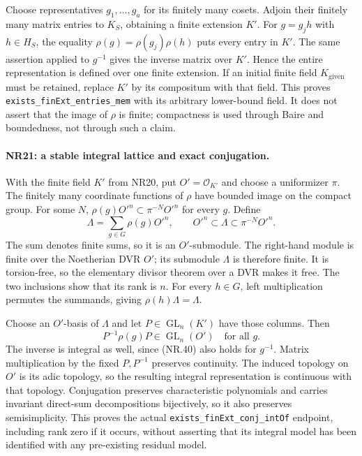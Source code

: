 Choose representatives $g_1,\ldots,g_a$ for its finitely many
cosets. Adjoin their finitely many matrix entries to $K_S$,
obtaining a finite extension $K'$. For $g=g_jh$ with $h\in H_S$,
the equality $\rho(g)=\rho(g_j)\rho(h)$ puts every entry in $K'$.
The same assertion applied to $g^{-1}$ gives the inverse matrix
over $K'$. Hence the entire representation is defined over one
finite extension. If an initial finite field $K_{\mathrm{given}}$
must be retained, replace $K'$ by its compositum with that field.
This proves \texttt{exists\_finExt\_entries\_mem} with its arbitrary
lower-bound field. It does not assert that the image of $\rho$
is finite; compactness is used through Baire and boundedness,
not through such a claim.

\paragraph{NR21: a stable integral lattice and exact conjugation.}
With the finite field $K'$ from NR20, put $O'=\mathcal O_{K'}$
and choose a uniformizer $\pi$. The finitely many coordinate
functions of $\rho$ have bounded image on the compact group.
For some $N$,
$\rho(g)O'^n\subset\pi^{-N}O'^n$ for every $g$. Define
\[
                         \Lambda=\sum_{g\in G}\rho(g)O'^n,
              \qquad O'^n\subset\Lambda\subset\pi^{-N}O'^n.
                                                               \tag{NR.39}
\]
The sum denotes finite sums, so it is an $O'$-submodule.
The right-hand module is finite over the Noetherian DVR $O'$;
its submodule $\Lambda$ is therefore finite. It is torsion-free,
so the elementary divisor theorem over a DVR makes it free.
The two inclusions show that its rank is $n$. For every $h\in G$,
left multiplication permutes the summands, giving
$\rho(h)\Lambda=\Lambda$.

Choose an $O'$-basis of $\Lambda$ and let $P\in\operatorname{GL}_n(K')$
have those columns. Then
\[
                    P^{-1}\rho(g)P\in\operatorname{GL}_n(O')
                                  \quad\text{for all }g.       \tag{NR.40}
\]
The inverse is integral as well, since (NR.40) also holds for
$g^{-1}$. Matrix multiplication by the fixed $P,P^{-1}$ preserves
continuity. The induced topology on $O'$ is its adic topology,
so the resulting integral representation is continuous with
that topology. Conjugation preserves characteristic polynomials
and carries invariant direct-sum decompositions bijectively,
so it also preserves semisimplicity. This proves the actual
\texttt{exists\_finExt\_conj\_intOf} endpoint, including rank
zero if it occurs, without asserting that its integral model
has been identified with any pre-existing residual model.


